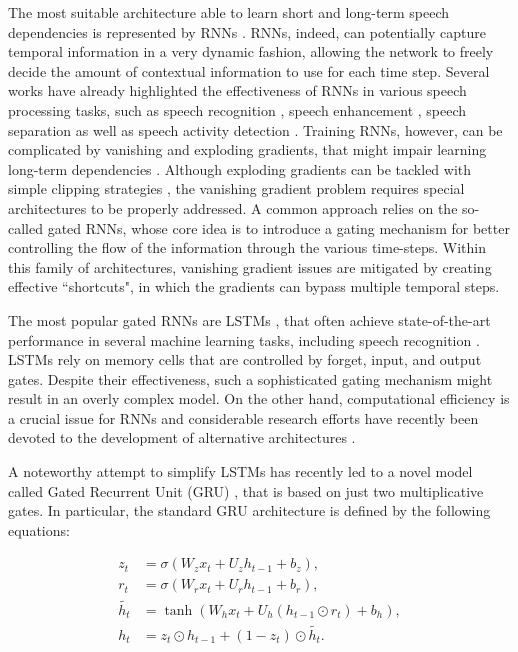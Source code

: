 \documentclass[journal]{IEEEtran}
\begin{document}
The most suitable architecture able to learn short and long-term speech dependencies is represented by RNNs \cite{lideng}. RNNs, indeed, can potentially capture temporal information in a very dynamic fashion, allowing the network to freely decide the amount of contextual information to use for each time step. Several works have already highlighted the effectiveness of RNNs in various speech processing tasks, such as speech recognition \cite{graves,lstm_speech,baidu,joint6,chime4_paper}, speech enhancement \cite{dnn_se3}, speech separation \cite{sep_lstm,ndnn1} as well as speech activity detection \cite{lstm_vad}.
Training RNNs, however, can be complicated by vanishing and exploding gradients, that might impair learning long-term dependencies \cite{Bengio94}.
Although exploding gradients can be tackled with simple clipping strategies \cite{pascanau}, the vanishing gradient problem requires special architectures to be properly addressed. A common approach relies on the so-called gated RNNs, whose core idea is to introduce a gating mechanism for better controlling the flow of the information through the various time-steps. Within this family of architectures, vanishing gradient issues are mitigated by creating effective ``shortcuts", in which the gradients can  bypass multiple temporal steps.

The most popular gated RNNs are LSTMs \cite{lstm}, that often achieve state-of-the-art performance in several machine learning tasks, including speech recognition \cite{graves,lstm_speech,baidu,dnn_se3,joint6,chime4_paper}.
LSTMs rely on memory cells that are controlled by forget, input, and output gates.
Despite their effectiveness, such a sophisticated gating mechanism might result in an overly complex model. On the other hand, computational efficiency is a crucial issue for RNNs and considerable research efforts have recently been devoted to the development of alternative architectures \cite{lstm_odyssey,gru3,lstm_highway}.

A noteworthy attempt to simplify LSTMs has recently led to a novel model called Gated Recurrent Unit (GRU) \cite{gru1,gru2}, that is based on just two multiplicative gates. In particular, the standard GRU architecture is defined by the following equations: 

\begin{subequations}
\begin{align}
z_{t}&=\sigma(W_{z}x_{t}+U_{z}h_{t-1}+b_{z}), \\
\label{eq:eq_2}r_{t}&=\sigma(W_{r}x_{t}+U_{r}h_{t-1}+b_{r}), \\
\label{eq:eq_3}\widetilde{h_{t}}&=\tanh(W_{h}x_{t}+U_{h}(h_{t-1} \odot r_{t})+b_{h}), \\
\label{eq:eq_4}h_{t}&=z_{t} \odot h_{t-1}+ (1-z_{t}) \odot \widetilde{h_{t}}.
\end{align}
\end{subequations}
\end{document}
